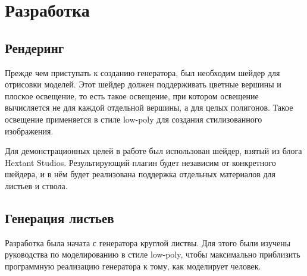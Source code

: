 \chapter{Разработка}
\section{Рендеринг}
Прежде чем приступать к созданию генератора, был необходим шейдер для отрисовки моделей. Этот шейдер должен поддерживать цветные вершины и плоское освещение, то есть такое освещение, при котором освещение вычисляется не для каждой отдельной вершины, а для целых полигонов. Такое освещение применяется в стиле low-poly для создания стилизованного изображения. 

Для демонстрационных целей в работе был использован шейдер, взятый из блога Hextant Studios. Результирующий плагин будет независим от конкретного шейдера, и в нём будет реализована поддержка отдельных материалов для листьев и ствола.

\section{Генерация листьев}
Разработка была начата с генератора круглой листвы. Для этого были изучены руководства по моделированию в стиле low-poly, чтобы максимально приблизить программную реализацию генератора к тому, как моделирует человек.

